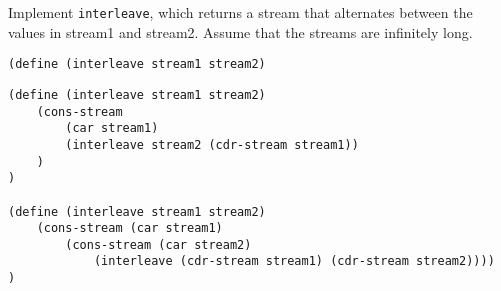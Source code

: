 \begin{blocksection}
\question Implement \lstinline$interleave$, which returns a stream that alternates between the values in stream1 and stream2.
Assume that the streams are infinitely long.

\ifprintanswers\else
\begin{lstlisting}
(define (interleave stream1 stream2)
\end{lstlisting}
\fi

\begin{solution}[1in]
\begin{lstlisting}
(define (interleave stream1 stream2)
    (cons-stream
        (car stream1)
        (interleave stream2 (cdr-stream stream1))
    )
)

(define (interleave stream1 stream2)
    (cons-stream (car stream1)
        (cons-stream (car stream2)
            (interleave (cdr-stream stream1) (cdr-stream stream2))))
)
\end{lstlisting}
\end{solution}
\end{blocksection}
